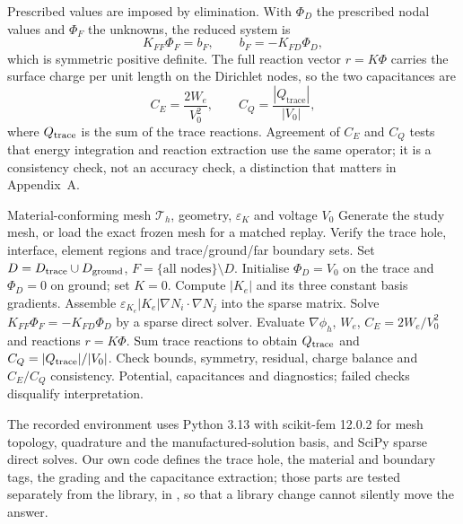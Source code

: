 \documentclass[11pt]{article}
\begin{document}
Prescribed values are imposed by elimination. With $\Phi_D$ the prescribed nodal values and
$\Phi_F$ the unknowns, the reduced system is
\begin{equation}
K_{FF}\Phi_F=b_F,\qquad b_F=-K_{FD}\Phi_D ,
\label{eq:elimination}
\end{equation}
which is symmetric positive definite. The full reaction vector $r=K\Phi$ carries the
surface charge per unit length on the Dirichlet nodes, so the two capacitances are
\begin{equation}
C_E=\frac{2W_e}{V_0^2},\qquad C_Q=\frac{|Q_{\mathrm{trace}}|}{|V_0|},
\label{eq:capacitance}
\end{equation}
where $Q_{\rm trace}$ is the sum of the trace reactions. Agreement of $C_E$ and $C_Q$ tests
that energy integration and reaction extraction use the same operator; it is a consistency
check, not an accuracy check, a distinction that matters in Appendix~A.

\begin{algorithm}[H]
\caption{Microstrip $P_1$ FEM solver}\label{alg:fem}
\begin{algorithmic}[1]
\Require Material-conforming mesh $\mathcal T_h$, geometry, $\varepsilon_K$ and voltage $V_0$
\State Generate the study mesh, or load the exact frozen mesh for a matched replay.
\State Verify the trace hole, interface, element regions and trace/ground/far boundary sets.
\State Set $D=D_{\rm trace}\cup D_{\rm ground}$, $F=\{\text{all nodes}\}\setminus D$.
\State Initialise $\Phi_D=V_0$ on the trace and $\Phi_D=0$ on ground; set $K=0$.
\State Compute $|K_e|$ and its three constant basis gradients.
\State Assemble $\varepsilon_{K_e}|K_e|\nabla N_i\cdot\nabla N_j$ into the sparse matrix.
\EndFor
\State Solve $K_{FF}\Phi_F=-K_{FD}\Phi_D$ by a sparse direct solver.
\State Evaluate $\nabla\phi_h$, $W_e$, $C_E=2W_e/V_0^2$ and reactions $r=K\Phi$.
\State Sum trace reactions to obtain $Q_{\rm trace}$ and $C_Q=|Q_{\rm trace}|/|V_0|$.
\State Check bounds, symmetry, residual, charge balance and $C_E/C_Q$ consistency.
\Ensure Potential, capacitances and diagnostics; failed checks disqualify interpretation.
\end{algorithmic}
\end{algorithm}

The recorded environment uses Python 3.13 with scikit-fem 12.0.2 for mesh topology,
quadrature and the manufactured-solution basis, and SciPy sparse direct solves. Our own
code defines the trace hole, the material and boundary tags, the grading and the
capacitance extraction; those parts are tested separately from the library, in
, so that a library change cannot silently move the answer.
\end{document}
